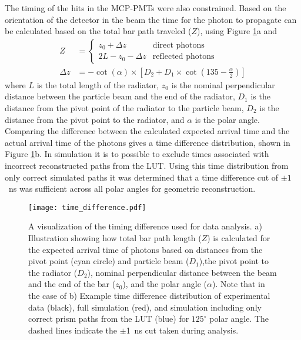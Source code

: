 The timing of the hits in the MCP-PMTs were also constrained. Based on the orientation of the detector in the beam the time for the photon to propagate can be calculated based on the total bar path traveled ($Z$), using Figure \ref{fig:time_difference}a and
\begin{equation}
\begin{split}
	Z &= 
	\begin{cases}
		z_0 + \Delta z  & \text{direct photons} \\
		2L - z_0 - \Delta z  & \text{reflected photons}
	\end{cases}
	\\
	\Delta z &= -\cot(\alpha) \times \left[ D_2 + D_1\times\cot\left( 135 - \frac{\alpha}{2} \right) \right]
\end{split}
	\label{eq:time_diff_prop}
\end{equation}
%
where $L$ is the total length of the radiator, $z_0$ is the nominal perpendicular distance between the particle beam and the end of the radiator, $D_1$ is the distance from the pivot point of the radiator to the particle beam, $D_2$ is the distance from the pivot point to the radiator, and $\alpha$ is the polar angle.
Comparing the difference between the calculated expected arrival time and the actual arrival time of the photons gives a time difference distribution, shown in Figure \ref{fig:time_difference}b. In simulation it is to possible to exclude times associated with incorrect reconstructed paths from the LUT. Using this time distribution from only correct simulated paths it was determined that a time difference cut of $\pm1$~ns was sufficient across all polar angles for geometric reconstruction.

\begin{figure}[!htb]
	\centering
	\texttt{[image: time\_difference.pdf]}
	\caption[A visualization of the timing difference used for data analysis.]{A visualization of the timing difference used for data analysis. a) Illustration showing how total bar path length ($Z$) is calculated for the expected arrival time of photons based on distances from the pivot point (cyan circle) and particle beam ($D_1$),the pivot point to the radiator ($D_2$), nominal perpendicular distance between the beam and the end of the bar ($z_0$), and the polar angle ($\alpha$). Note that in the case of b) Example time difference distribution of experimental data (black), full simulation (red), and simulation including only correct prism paths from the LUT (blue) for $125^\circ$ polar angle. The dashed lines indicate the $\pm$1~ns cut taken during analysis. }
	\label{fig:time_difference}
\end{figure}


